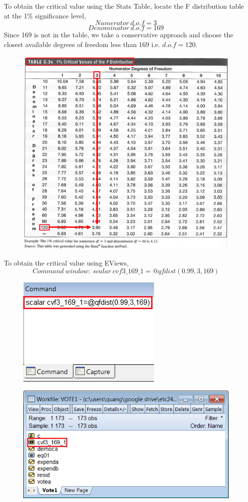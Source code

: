 \documentclass[12pt]{report}
\begin{document}
\noindent To obtain the critical value using the Stats Table, locate the F distribution table at the 1\% significance level,
$$Numerator\ d.o.f = 3$$
$$Denominator\ d.o.f = 169$$
\noindent Since 169 is not in the table, we take a conservative approach and choose the closest available degrees of freedom less than 169 i.e. $d.o.f=120$. 
\begin{figure}[H]
	\centering
	\includegraphics{q1_5}
\end{figure}
\vspace{-\baselineskip}
\noindent To obtain the critical value using EViews,
$$Command\ window:\ scalar\ cvf3\_169\_1=@qfdist(0.99,3,169)$$
\begin{figure}[H]
	\centering
	\includegraphics{q1_6}
\end{figure}
\vspace{-\baselineskip}
\begin{figure}[H]
	\centering
	\includegraphics{q1_7}
\end{figure}
\end{document}
